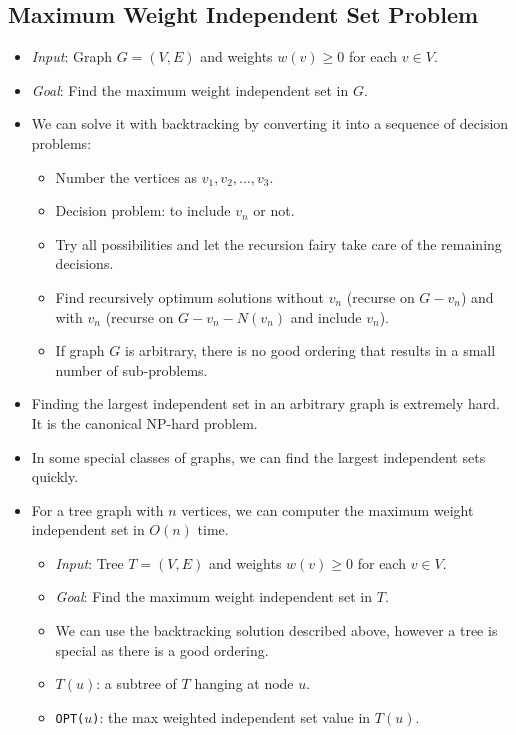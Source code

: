 \subsection{Maximum Weight Independent Set Problem}
\begin{itemize}
    \item \textit{Input}: Graph $G = (V, E)$ and weights $w(v) \geq 0$ for each $v \in V$.
    \item \textit{Goal}: Find the maximum weight independent set in $G$.
    \item We can solve it with backtracking by converting it into a sequence of decision problems:
    \begin{itemize}
        \item Number the vertices as $v_1, v_2, ..., v_3$.
        \item Decision problem: to include $v_n$ or not.
        \item Try all possibilities and let the recursion fairy take care of the remaining decisions.
        \item Find recursively optimum solutions without $v_n$ (recurse on $G - v_n$) and with $v_n$ (recurse on $G - v_n - N(v_n)$ and include $v_n$).
        \item If graph $G$ is arbitrary, there is no good ordering that results in a small number of sub-problems.
    \end{itemize}
    \item Finding the largest independent set in an arbitrary graph is extremely hard. It is the canonical NP-hard problem.
    \item In some special classes of graphs, we can find the largest independent sets quickly.
    \item For a tree graph with $n$ vertices, we can computer the maximum weight independent set in $O(n)$ time.
    \begin{itemize}
        \item \textit{Input}: Tree $T = (V, E)$ and weights $w(v) \geq 0$ for each $v \in V$.
        \item \textit{Goal}: Find the maximum weight independent set in $T$.
        \item We can use the backtracking solution described above, however a tree is special as there is a good ordering.
        \item $T(u)$: a subtree of $T$ hanging at node $u$.
        \item \texttt{OPT($u$)}: the max weighted independent set value in $T(u)$.

\end{itemize}
\end{itemize}
